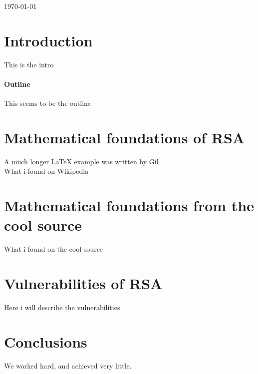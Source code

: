 \documentclass[12pt, a4paper]{article}
\begin{document}
\begin{titlepage}
		
		
		\vfill\vfill\vfill %
		
		{\large\today} %
		
		
		
		
		\vfill %
		
	\end{titlepage}

\section{Introduction}
This is the intro
\paragraph{Outline}
This seems to be the outline

\section{Mathematical foundations of RSA}\label{mathematical foundations of RSA}
A much longer \LaTeX{} example was written by Gil~\cite{Gil:02}.\\
What i found on Wikipedia

\section{Mathematical foundations from the cool source}\label{mathematical foundations from cool source}
What i found on the cool source

\section{Vulnerabilities of RSA}\label{vulnerabilities of RSA}
Here i will describe the vulnerabilities

\section{Conclusions}\label{conclusions}
We worked hard, and achieved very little.



	
	
\end{document}
